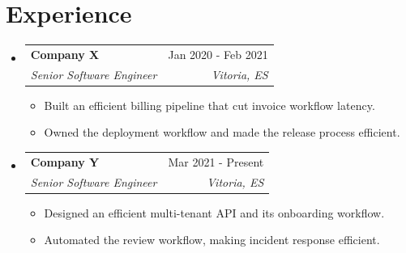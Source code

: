 \documentclass[letterpaper,10pt]{article}
\makeatletter
\newcommand{\resumeItem}[1]{\item\small{#1}}
\newcommand{\resumeSubHeadingList}{\begin{itemize}[leftmargin=0.15in, label={}]}
\newcommand{\resumeSubHeadingListEnd}{\end{itemize}}
\newcommand{\resumeSubheading}[4]{
\vspace{-1pt}\item
  \begin{tabular*}{0.97\textwidth}[t]{l@{\extracolsep{\fill}}r}
    \textbf{#1} & #2 \\
    \textit{#3} & \textit{#4} \\
  \end{tabular*}\vspace{-7pt}
}
\makeatother
\begin{document}
\section{Experience}
\resumeSubHeadingList
  \resumeSubheading
      {Company X}{Jan 2020 - Feb 2021}
      {Senior Software Engineer}{Vitoria, ES}
      \resumeSubHeadingList
          \resumeItem{Built an efficient billing pipeline that cut invoice workflow latency.}
          \resumeItem{Owned the deployment workflow and made the release process efficient.}
      \resumeSubHeadingListEnd
  \resumeSubheading
      {Company Y}{Mar 2021 - Present}
      {Senior Software Engineer}{Vitoria, ES}
      \resumeSubHeadingList
          \resumeItem{Designed an efficient multi-tenant API and its onboarding workflow.}
          \resumeItem{Automated the review workflow, making incident response efficient.}
      \resumeSubHeadingListEnd
\resumeSubHeadingListEnd
\end{document}
